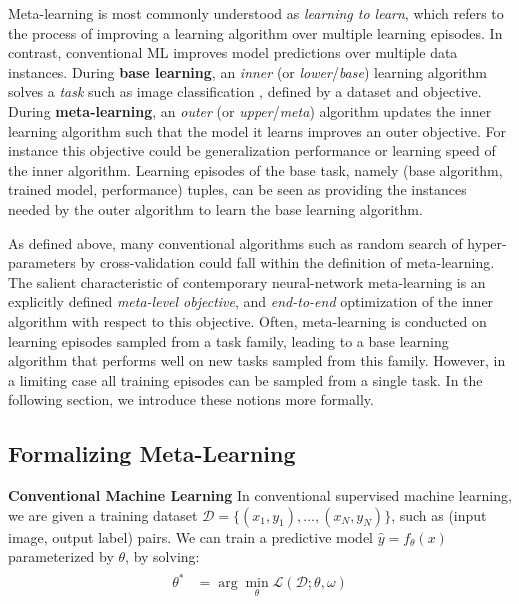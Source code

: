 \documentclass[10pt,journal,compsoc]{IEEEtran}
\newcommand{\keypoint}[1]{\vspace{0.1cm}\noindent\textbf{#1}\quad}
\begin{document}
Meta-learning is most commonly understood as \emph{learning to learn}, which refers to the process of improving a learning algorithm over multiple learning episodes. In contrast, conventional ML improves model predictions over multiple data instances. During \textbf{base learning}, an \emph{inner} (or \emph{lower}/\emph{base}) learning algorithm solves a \emph{task} such as image classification \cite{krizhevsky2012imagenetdeepcnn}, defined by a dataset and objective. During \textbf{meta-learning}, an \emph{outer} (or \emph{upper}/\emph{meta}) algorithm updates the inner learning algorithm such that the model it learns improves an outer objective. For instance this objective could be generalization performance or learning speed of the inner algorithm. Learning episodes of the base task, namely (base algorithm, trained model, performance) tuples, can be seen as providing the instances needed by the outer algorithm to learn the base learning algorithm.

As defined above, many conventional algorithms such as random search of hyper-parameters by cross-validation could fall within the definition of meta-learning. The salient characteristic of contemporary neural-network meta-learning is an explicitly defined \emph{meta-level objective}, and \emph{end-to-end} optimization of the inner algorithm with respect to this objective. Often, meta-learning is conducted on learning episodes sampled from a task family, leading to a base learning algorithm that performs well on new tasks sampled from this family. However, in a limiting case all training episodes can be sampled from a single task. In the following section, we introduce these notions more formally.


\subsection{Formalizing Meta-Learning}\label{sec:formalize}



\keypoint{Conventional Machine Learning}
In conventional supervised machine learning, we are given a training dataset $\mathcal{D}=\{(x_1,y_1),\dots,(x_N,y_N)\}$, such as (input image, output label) pairs. We can train a predictive model $\hat{y}=f_\theta(x)$ parameterized by $\theta$, by solving:
\begin{align}
\begin{split}
\label{eq:supervised}
\theta^* &= \arg\min_{\theta} \mathcal{L}(\mathcal{D};\theta,\omega)
\end{split}
\end{align}
\end{document}

